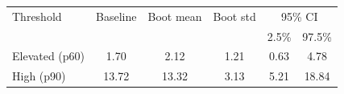 \begin{tabular}{lccccc}
\toprule
Threshold & Baseline & Boot mean & Boot std & \multicolumn{2}{c}{95\% CI} \\
 & & & & 2.5\% & 97.5\% \\
\midrule
Elevated (p60) & 1.70 & 2.12 & 1.21 & 0.63 & 4.78 \\
High (p90) & 13.72 & 13.32 & 3.13 & 5.21 & 18.84 \\
\bottomrule
\end{tabular}
